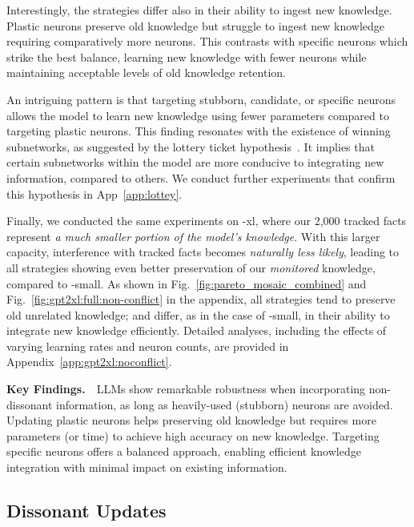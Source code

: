 Interestingly, the strategies differ also in their ability to ingest new knowledge. Plastic neurons preserve old knowledge but struggle to ingest new knowledge requiring comparatively more neurons. This contrasts with specific neurons which strike the best balance, learning new knowledge with fewer neurons while maintaining acceptable levels of old knowledge retention.

An intriguing pattern is that targeting stubborn, candidate, or specific neurons allows the model to learn new knowledge using fewer parameters compared to targeting plastic neurons. This finding resonates with the existence of winning subnetworks, as suggested by the lottery ticket hypothesis~\citep{frankle2018lottery}. It implies that certain subnetworks within the model are more conducive to integrating new information, compared to others. We conduct further experiments that confirm this hypothesis in App~\ref{app:lottey}.

Finally, we conducted the same experiments on \gpttwo-xl, where our 2,000 tracked facts represent \textit{a much smaller portion of the model's knowledge}. With this larger capacity, interference with tracked facts becomes \textit{naturally less likely}, leading to all strategies showing even better preservation of our \textit{monitored} knowledge, compared to \gpttwo-small.
As shown in Fig.~\ref{fig:pareto_mosaic_combined} and Fig.~\ref{fig:gpt2xl:full:non-conflict} in the appendix, all strategies tend to preserve old unrelated knowledge; and differ, as in the case of \gpttwo-small, in their ability to integrate new knowledge efficiently. Detailed analyses, including the effects of varying learning rates and neuron counts, are provided in Appendix~\ref{app:gpt2xl:noconflict}. 

\textbf{Key Findings.}\ \   
LLMs show remarkable robustness when incorporating non-dissonant information, as long as heavily-used (stubborn) neurons are avoided.
Updating plastic neurons helps preserving old knowledge but requires more parameters (or time) to achieve high accuracy on new knowledge. Targeting specific neurons offers a balanced approach, enabling efficient knowledge integration with minimal impact on existing information. 

\subsection{Dissonant Updates}\label{app:dissonant}

